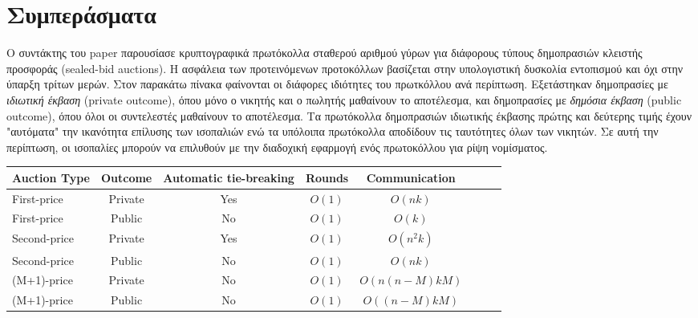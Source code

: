 \documentclass[letterpaper,11pt]{article}
\begin{document}
\section{Συμπεράσματα} Ο συντάκτης του paper παρουσίασε κρυπτογραφικά πρωτόκολλα σταθερού αριθμού γύρων για διάφορους τύπους δημοπρασιών κλειστής
προσφοράς (sealed-bid auctions). Η ασφάλεια των προτεινόμενων προτοκόλλων βασίζεται στην υπολογιστική δυσκολία εντοπισμού και όχι στην ύπαρξη
τρίτων μερών. Στον παρακάτω πίνακα φαίνονται οι διάφορες ιδιότητες του πρωτκόλλου ανά περίπτωση. Εξετάστηκαν δημοπρασίες με \emph{ιδιωτική έκβαση}
(private outcome), όπου μόνο ο νικητής και ο πωλητής μαθαίνουν το αποτέλεσμα, και δημοπρασίες με \emph{δημόσια έκβαση} (public outcome), όπου όλοι
οι συντελεστές μαθαίνουν το αποτέλεσμα. Τα πρωτόκολλα δημοπρασιών ιδιωτικής έκβασης πρώτης και δεύτερης τιμής έχουν "αυτόματα" την ικανότητα
επίλυσης των ισοπαλιών ενώ τα υπόλοιπα πρωτόκολλα αποδίδουν τις ταυτότητες όλων των νικητών. Σε αυτή την περίπτωση, οι ισοπαλίες μπορούν να
επιλυθούν με την διαδοχική εφαρμογή ενός πρωτοκόλλου για ρίψη νομίσματος.

\begin{center}
\begin{tabular}{l*{6}{c}r}
	Auction Type	& Outcome 	& Automatic tie-breaking 	& Rounds 	& Communication\\
	\hline
	First-price 	& Private	& Yes						& $O(1)$	& $O(nk)$\\
	First-price		& Public	& No						& $O(1)$	& $O(k)$\\
	Second-price	& Private	& Yes						& $O(1)$	& $O(n^2k)$\\
	Second-price    & Public	& No						& $O(1)$	& $O(nk)$\\
	(M+1)-price    	& Private	& No						& $O(1)$	& $O(n(n-M)kM)$\\
	(M+1)-price    	& Public	& No						& $O(1)$	& $O((n-M)kM)$\\
\end{tabular}
\end{center}
\end{document}
